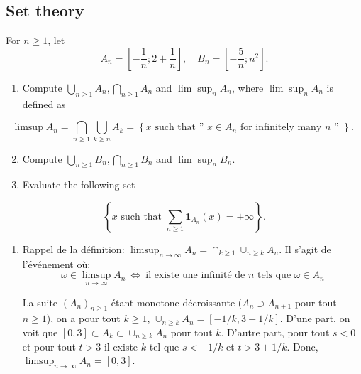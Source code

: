 \begin{center}
  \section*{Set theory}
\end{center}

\begin{Exercise}
  For $n \geq 1$, let
  \[
    A_{n}=\left[-\frac{1}{n} ; 2+\frac{1}{n}\right], \quad B_{n}=\left[-\frac{5}{n} ; n^{2}\right] .
  \]
  \begin{enumerate}
    \item Compute $\bigcup_{n \geq 1} A_{n}, \bigcap_{n \geq 1} A_{n}$ and $\lim \sup _{n} A_{n}$, where $\lim \sup _{n} A_{n}$ is defined as
  \end{enumerate}
  \[
    \limsup A_{n}=\bigcap_{n \geq 1} \bigcup_{k \geq n} A_{k}=\left\{x \text { such that '' } x \in A_{n} \text { for infinitely many } n \text { '' }\right\} \text {. }
  \]
  \begin{enumerate}
    \setcounter{enumi}{1}
    \item Compute $\bigcup_{n \geq 1} B_{n}, \bigcap_{n \geq 1} B_{n}$ and $\lim \sup _{n} B_{n}$.

    \item Evaluate the following set

  \end{enumerate}
  \[
    \left\{x \text { such that } \sum_{n \geq 1} \mathbf{1}_{A_{n}}(x)=+\infty\right\} .
  \]
\end{Exercise}

\begin{solution}
  \begin{enumerate}
    \item
          Rappel de la d\'efinition: $\limsup_{n \rightarrow \infty} A_{n} =\cap_{k\geq 1} \cup_{n\ge k} A_n$.
          Il s'agit de l'\'ev\'enement o\`u:
          \[
            \omega \in \limsup_{n \rightarrow \infty} A_{n}  \ \Longleftrightarrow \  \textrm{il existe une infinit\'e de  $n$ tels que } \omega \in A_{n}
          \]

          La suite ${(A_n)}_{n\ge 1}$ \'etant monotone d\'ecroissante ($A_n \supset A_{n+1}$ pour tout $n\ge1$), on a pour tout $k\ge1$, $\cup_{n\ge k} A_n=[-1/k,3+1/k]$. D'une part, on voit que $[0,3]\subset A_k\subset \cup_{n\ge k} A_n$ pour tout $k$. D'autre part, pour tout $s<0$ et pour tout $t>3$ il existe $k$ tel que $s<-1/k$ et $t>3+1/k$. Donc, $\limsup_{n \rightarrow \infty} A_{n}=[0,3]$.
  \end{enumerate}
\end{solution}